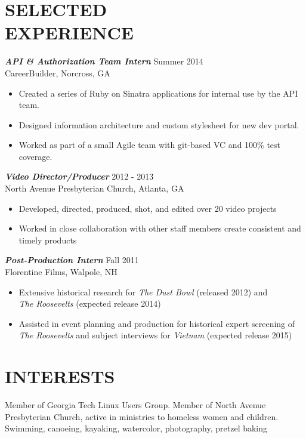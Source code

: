 \documentclass[margin]{res}
\begin{document}
\begin{resume}
\section{SELECTED \\ EXPERIENCE}    
                {\sl \textbf{API \& Authorization Team Intern}} \hfill Summer 2014 \\
                    CareerBuilder, Norcross, GA
                 \begin{itemize}  \itemsep -2pt %
                 \item Created a series of Ruby on Sinatra applications for internal use by the API team.
                 \item Designed information architecture and custom stylesheet for new dev portal.
                 \item Worked as part of a small Agile team with git-based VC and 100\% test coverage.
                \end{itemize}

                {\sl \textbf{Video Director/Producer}} \hfill            2012 - 2013 \\
                 North Avenue Presbyterian Church, Atlanta, GA
                 \begin{itemize}  \itemsep -2pt %
                 \item Developed, directed, produced, shot, and edited over 20 video projects
                 \item Worked in close collaboration with other staff members create consistent and timely products
                 \end{itemize} 

                {\sl \textbf{Post-Production Intern}} \hfill       Fall 2011 \\
                Florentine Films, Walpole, NH
                  \begin{itemize}  \itemsep -2pt
                   \item Extensive historical research for {\sl The Dust Bowl} (released                                
                   2012) and\\ {\sl The Roosevelts} (expected release 2014)
                   \item Assisted in event planning and production for historical expert                                
                   screening of\\ {\sl The Roosevelts} and subject interviews for {\sl Vietnam} (expected release 2015) 
                   \end{itemize} 
 
\section{INTERESTS}  Member of Georgia Tech Linux Users Group. Member of North Avenue Presbyterian Church, 
                    active in ministries to homeless women and children. \\Swimming, canoeing, kayaking, watercolor, photography, pretzel baking\\
   

\end{resume}
\end{document}
